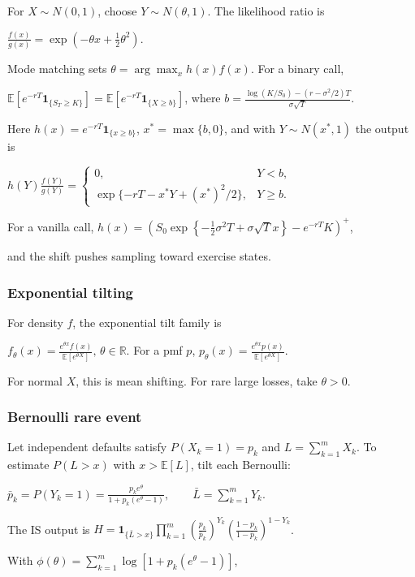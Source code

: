 For $X\sim N(0,1)$, choose $Y\sim N(\theta,1)$. The likelihood ratio is

$\frac{f(x)}{g(x)}=\exp\left(-\theta x+\frac12\theta^2\right)$.

Mode matching sets $\theta=\arg\max_x h(x)f(x)$. For a binary call,

$\mathbb{E}[e^{-rT}\mathbf{1}_{\{S_T\ge K\}}]=\mathbb{E}[e^{-rT}\mathbf{1}_{\{X\ge b\}}]$,
where
$b=\frac{\log(K/S_0)-(r-\sigma^2/2)T}{\sigma\sqrt{T}}$.

Here $h(x)=e^{-rT}\mathbf{1}_{\{x\ge b\}}$, $x^*=\max\{b,0\}$, and with $Y\sim N(x^*,1)$ the output is

$h(Y)\frac{f(Y)}{g(Y)}=\begin{cases}0,&Y<b,\\ \exp\{-rT-x^*Y+(x^*)^2/2\},&Y\ge b.\end{cases}$

For a vanilla call,
$h(x)=\left(S_0\exp\left\{-\frac12\sigma^2T+\sigma\sqrt{T}x\right\}-e^{-rT}K\right)^+$,

and the shift pushes sampling toward exercise states.

\subsubsection*{Exponential tilting}

For density $f$, the exponential tilt family is

$f_\theta(x)=\frac{e^{\theta x}f(x)}{\mathbb{E}[e^{\theta X}]},\, \theta\in\mathbb{R}$.
For a pmf $p$,
$p_\theta(x)=\frac{e^{\theta x}p(x)}{\mathbb{E}[e^{\theta X}]}$.

For normal $X$, this is mean shifting. For rare large losses, take $\theta>0$.

\subsubsection*{Bernoulli rare event}

Let independent defaults satisfy $P(X_k=1)=p_k$ and $L=\sum_{k=1}^mX_k$. To estimate $P(L>x)$ with $x>\mathbb{E}[L]$, tilt each Bernoulli:

$\bar{p}_k=P(Y_k=1)=\frac{p_ke^\theta}{1+p_k(e^\theta-1)},\qquad \bar{L}=\sum_{k=1}^mY_k$.

The IS output is
$H=\mathbf{1}_{\{\bar{L}>x\}}\prod_{k=1}^m\left(\frac{p_k}{\bar{p}_k}\right)^{Y_k}\left(\frac{1-p_k}{1-\bar{p}_k}\right)^{1-Y_k}$.

With
$\phi(\theta)=\sum_{k=1}^m\log[1+p_k(e^\theta-1)]$,


